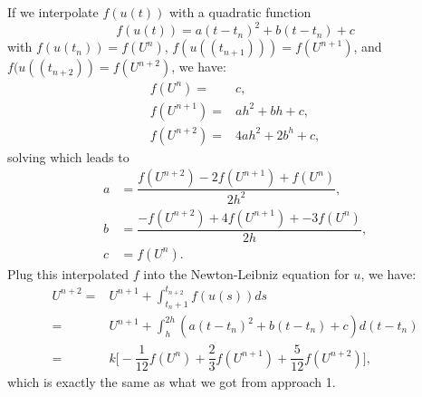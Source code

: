 \documentclass[11pt]{article}
\begin{document}
\subsection{}
If we interpolate $f(u(t))$ with a quadratic function
\begin{equation}
    f(u(t)) = a(t-t_n)^2 + b(t-t_n) + c
\end{equation} 
with $f(u(t_n))=f(U^n)$, $f(u((t_{n+1}))) = f(U^{n+1})$, and 
$f(u((t_{n+2})) = f(U^{n+2})$, we have:
\begin{equation}\begin{split}
    f(U^n) =& c,\\
    f(U^{n+1}) =& ah^2 + bh + c,\\
    f(U^{n+2}) =& 4ah^2 + 2b^h + c,
\end{split}\end{equation}
solving which leads to
\begin{equation}\begin{split}
    a &= \dfrac{f(U^{n+2}) - 2f(U^{n+1}) + f(U^n)}{2h^2},\\
    b &= \dfrac{-f(U^{n+2}) + 4f(U^{n+1}) + -3f(U^n)}{2h},\\
    c &= f(U^n).
\end{split}\end{equation} 
Plug this interpolated $f$ into the Newton-Leibniz equation for $u$, we have:
\begin{equation}\begin{split}
    U^{n+2}=&U^{n+1}+\int_{t_n+1}^{t_{n+2}}f(u(s))ds\\
           =&U^{n+1}+\int_h^{2h}(a(t-t_n)^2+b(t-t_n)+c)d(t-t_n)\\
           =&k\Big[-\dfrac1{12}f(U^{n}) + \dfrac23f(U^{n+1}) + \dfrac5{12}f(U^{n+2})\Big],
\end{split}\end{equation}
which is exactly the same as what we got from approach 1.

\pagebreak
\section{}

\pagebreak
\section{}

\pagebreak
\section{}
\end{document}
